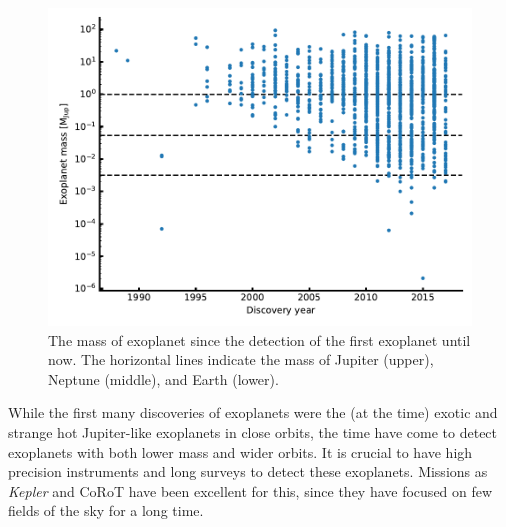 \begin{figure}[htpb!]
    \centering
    \includegraphics[width=0.8\linewidth]{figures/exoplanetMass.pdf}
    \caption{The mass of exoplanet since the detection of the first exoplanet until now. The
             horizontal lines indicate the mass of Jupiter (upper), Neptune (middle), and Earth
             (lower).}
    \label{fig:exoplanetMass}
\end{figure}

While the first many discoveries of exoplanets were the (at the time) exotic and strange hot
Jupiter-like exoplanets in close orbits, the time have come to detect exoplanets with both lower
mass and wider orbits. It is crucial to have high precision instruments and long surveys to detect
these exoplanets. Missions as \emph{Kepler} and CoRoT have been excellent for this, since they have
focused on few fields of the sky for a long time.

